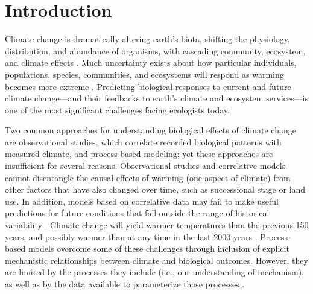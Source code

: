 \documentclass{article}
\begin{document}
 
\section* {Introduction}
\par Climate change is dramatically altering earth's biota, shifting the physiology, distribution, and abundance of organisms, with cascading community, ecosystem, and climate effects \citep{shukla1982,cox2000,thomas2004,parmesan2006,field2007,sheldon2011,urban2012}. Much uncertainty exists about how particular individuals, populations, species, communities, and ecosystems will respond as warming becomes more extreme \citep{thuiller2004,friedlingstein2014}.
Predicting biological responses to current and future climate change---and their feedbacks to earth's climate and ecosystem services---is one of the most significant challenges facing ecologists today.
\par Two common approaches for understanding biological effects of climate change are observational studies, which correlate recorded biological patterns with measured climate, and process-based modeling; yet these approaches are insufficient for several reasons. 
Observational studies and correlative models cannot disentangle the causal effects of warming (one aspect of climate) from other factors that have also changed over time, such as successional stage or land use. In addition, models based on correlative data may fail to make useful predictions for future conditions that fall outside the range of historical variability \citep [e.g.,][]{pearson2004,hampe2004,ibanez2006,swab2012,chuine2016}. Climate change will yield warmer temperatures than the previous 150 years, and possibly warmer than at any time in the last 2000 years \citep{ohlemuller2006,williams2007,williams2007b,ipcc2013}. Process-based models overcome some of these challenges through inclusion of explicit mechanistic relationships between climate and biological outcomes. However, they are limited by the processes they include (i.e., our understanding of mechanism), as well as by the data available to parameterize those processes \citep{moorcroft2006,kearney2009}. 
\end{document}
